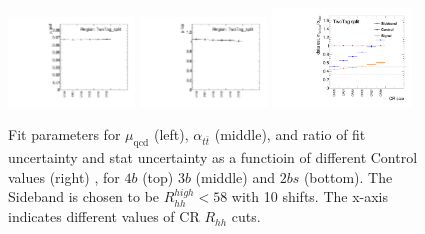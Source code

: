 \begin{figure}[htbp!]
\begin{center}
\includegraphics[width=0.3\textwidth,angle=-90]{figures/boosted/Appendix_SB/TwoTag_split_muqcdCR.pdf}
\includegraphics[width=0.3\textwidth,angle=-90]{figures/boosted/Appendix_SB/TwoTag_split_mutopCR.pdf}
\includegraphics[width=0.33\textwidth,angle=-90]{figures/boosted/Appendix_SB/data_est_TwoTag_split_sigma_compareCR.pdf}
  \caption{Fit parameters for $\mu_{\text{qcd}}$ (left), $\alpha_{t\bar{t}}$ (middle), and ratio of fit uncertainty and stat uncertainty as a functioin of different Control values (right) , for $4b$ (top) $3b$ (middle) and $2bs$ (bottom). The Sideband is chosen to be $R_{hh}^{high} < 58$ with 10 \GeV shifts. The x-axis indicates different values of CR $R_{hh}$ cuts.}
  \label{fig:app-sb-muqcd-diffCR}
\end{center}
\end{figure}

